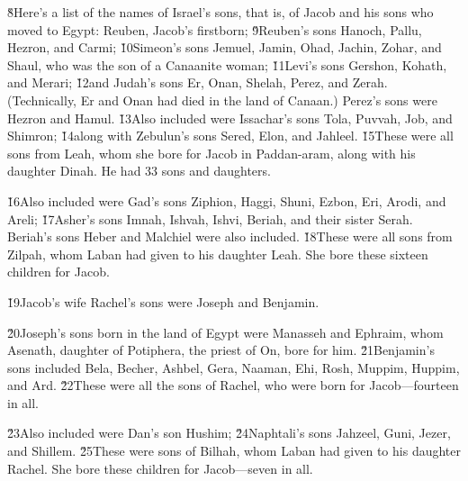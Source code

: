 \v{8}Here's a list of the names of Israel's sons, that is, of Jacob and his sons who moved to Egypt: Reuben, Jacob's firstborn; \v{9}Reuben's sons Hanoch, Pallu, Hezron, and Carmi; \v{10}Simeon's sons Jemuel, Jamin, Ohad, Jachin, Zohar, and Shaul, who was the son of a Canaanite woman; \v{11}Levi's sons Gershon, Kohath, and Merari; \v{12}and Judah's sons Er, Onan, Shelah, Perez, and Zerah. (Technically, Er and Onan had died in the land of Canaan.) Perez's sons were Hezron and Hamul. \v{13}Also included were Issachar's sons Tola, Puvvah, Job, and Shimron; \v{14}along with Zebulun's sons Sered, Elon, and Jahleel. \v{15}These were all sons from Leah, whom she bore for Jacob in Paddan-aram, along with his daughter Dinah. He had 33 sons and daughters.

\v{16}Also included were Gad's sons Ziphion, Haggi, Shuni, Ezbon, Eri, Arodi, and Areli; \v{17}Asher's sons Imnah, Ishvah, Ishvi, Beriah, and their sister Serah. Beriah's sons Heber and Malchiel were also included. \v{18}These were all sons from Zilpah, whom Laban had given to his daughter Leah. She bore these sixteen children for Jacob.

\v{19}Jacob's wife Rachel's sons were Joseph and Benjamin.

\v{20}Joseph's sons born in the land of Egypt were Manasseh and Ephraim, whom Asenath, daughter of Potiphera, the priest of On, bore for him. \v{21}Benjamin's sons included Bela, Becher, Ashbel, Gera, Naaman, Ehi, Rosh, Muppim, Huppim, and Ard. \v{22}These were all the sons of Rachel, who were born for Jacob---fourteen in all.

\v{23}Also included were Dan's son Hushim; \v{24}Naphtali's sons Jahzeel, Guni, Jezer, and Shillem. \v{25}These were sons of Bilhah, whom Laban had given to his daughter Rachel. She bore these children for Jacob---seven in all.

